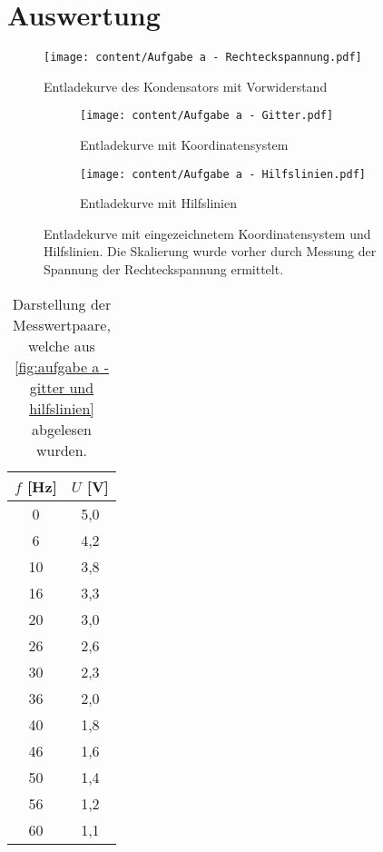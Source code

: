 \section{Auswertung}
\label{sec:Auswertung}
\begin{figure}
  \centering
  \texttt{[image: content/Aufgabe a - Rechteckspannung.pdf]}
  \caption{Entladekurve des Kondensators mit Vorwiderstand}
  \label{fig:aufgabe a - rechteckspannung}
\end{figure}

\begin{figure}
  \begin{subfigure}{0.48\textwidth}
    \centering
    \texttt{[image: content/Aufgabe a - Gitter.pdf]}
    \caption{Entladekurve mit Koordinatensystem}
    \label{fig:aufgabe a - gitter}
  \end{subfigure}
  \hfill
  \begin{subfigure}{0.48\textwidth}
    \centering
    \texttt{[image: content/Aufgabe a - Hilfslinien.pdf]}
    \caption{Entladekurve mit Hilfslinien}
    \label{fig:aufgabe a - hilfslinien}
  \end{subfigure}
  \caption{Entladekurve mit eingezeichnetem Koordinatensystem und Hilfslinien. Die %
    Skalierung wurde vorher durch Messung der Spannung der Rechteckspannung ermittelt.}
  \label{fig:aufgabe a - gitter und hilfslinien}
\end{figure}

\begin{table}
  \centering
  \caption{Darstellung der Messwertpaare, welche aus \autoref{fig:aufgabe a - gitter und hilfslinien} abgelesen wurden.}
  \label{tab:aufgabe a}
  \begin{tabular}{c c}
    \toprule
    $f$ [Hz] & $U$ [V] \\
    \midrule
    0 &  5,0 \\
    6	&  4,2 \\
    10 & 3,8 \\
    16 & 3,3 \\
    20 & 3,0 \\
    26 & 2,6 \\
    30 & 2,3 \\
    36 & 2,0 \\
    40 & 1,8 \\
    46 & 1,6 \\
    50 & 1,4 \\
    56 & 1,2 \\
    60 & 1,1 \\
    \bottomrule
  \end{tabular}
\end{table}

